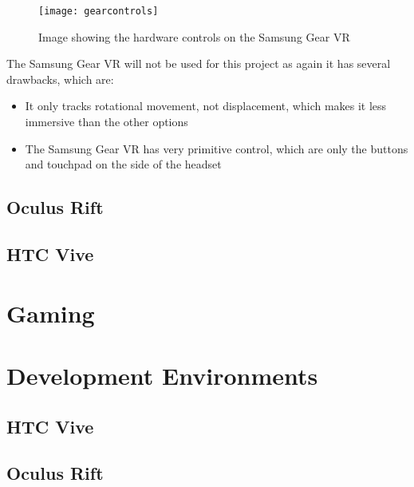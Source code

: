 \begin{figure}[H]
	\texttt{[image: gearcontrols]}
	\centering
	\caption{Image showing the hardware controls on the Samsung Gear VR}
	\label{fig:gearcontrols}
\end{figure}

	The Samsung Gear VR will not be used for this project as again it has several drawbacks, which are:

\begin{itemize}
	\item It only tracks rotational movement, not displacement, which makes it less immersive than the other options
	\item The Samsung Gear VR has very primitive control, which are only the buttons and touchpad on the side of the headset
\end{itemize}		


\subsection{Oculus Rift}
\lipsum[1-1] \cite{parikh1980adaptive}

\subsection{HTC Vive}
\lipsum[1-1] \cite{parikh1980adaptive}

\section{Gaming}
\lipsum[1-1] \cite{parikh1980adaptive}

\section{Development Environments}
\lipsum[1-1] \cite{parikh1980adaptive}

\subsection{HTC Vive}
\lipsum[1-1]

\subsection{Oculus Rift}
\lipsum[1-1]